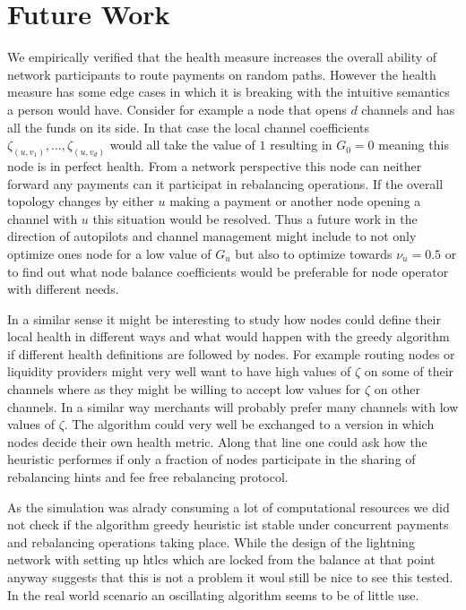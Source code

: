 \documentclass[a4paper]{paper}
\begin{document}
\section{Future Work}\label{sec:future}
We empirically verified that the health measure increases the overall ability of network participants to route payments on random paths.
However the health measure has some edge cases in which it is breaking with the intuitive semantics a person would have.
Consider for example a node that opens $d$ channels and has all the funds on its side.
In that case the local channel coefficients $\zeta_{(u,v_1)},\dots,\zeta_{(u,v_d)}$ would all take the value of $1$ resulting in $G_0 = 0$ meaning this node is in perfect health.
From a network perspective this node can neither forward any payments can it participat in rebalancing operations.
If the overall topology changes by either $u$ making a payment or another node opening a channel with $u$ this situation would be resolved.
Thus a future work in the direction of autopilots and channel management might include to not only optimize ones node for a low value of $G_u$ but also to optimize towards $\nu_u = 0.5$ or to find out what node balance coefficients would be preferable for node operator with different needs.

In a similar sense it might be interesting to study how nodes could define their local health in different ways and what would happen with the greedy algorithm if different health definitions are followed by nodes.
For example routing nodes or liquidity providers might very well want to have high values of $\zeta$ on some of their channels where as they might be willing to accept low values for $\zeta$ on other channels.
In a similar way merchants will probably prefer many channels with low values of $\zeta$.
The algorithm could very well be exchanged to a version in which nodes decide their own health metric.
Along that line one could ask how the heuristic performes if only a fraction of nodes participate in the sharing of rebalancing hints and fee free rebalancing protocol.

As the simulation was alrady consuming a lot of computational resources we did not check if the algorithm greedy heuristic ist stable under concurrent payments and rebalancing operations taking place.
While the design of the lightning network with setting up htlcs which are locked from the balance at that point anyway suggests that this is not a problem it woul still be nice to see this tested.
In the real world scenario an oscillating algorithm seems to be of little use. 
\end{document}
